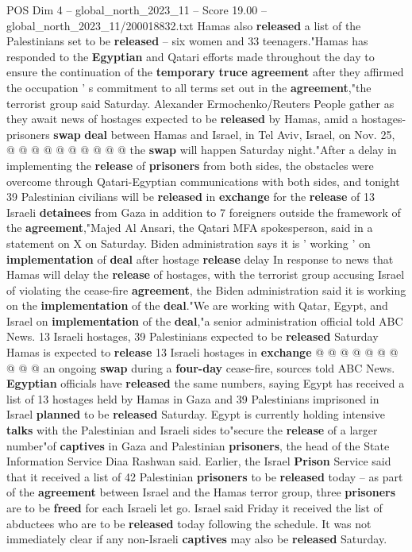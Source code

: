 \begin{textsample}{POS Dim 4 – global\_north\_2023\_11 – Score 19.00 – global\_north\_2023\_11/200018832.txt}
Hamas also \textbf{released} a list of the Palestinians set to be \textbf{released} -- six women and 33 teenagers."Hamas has responded to the \textbf{Egyptian} and Qatari efforts made throughout the day to ensure the continuation of the \textbf{temporary} \textbf{truce} \textbf{agreement} after they affirmed the occupation ' s commitment to all terms set out in the \textbf{agreement},"the terrorist group said Saturday.
Alexander Ermochenko/Reuters People gather as they await news of hostages expected to be \textbf{released} by Hamas, amid a hostages-prisoners \textbf{swap} \textbf{deal} between Hamas and Israel, in Tel Aviv, Israel, on Nov. 25, @ @ @ @ @ @ @ @ @ @ the \textbf{swap} will happen Saturday night."After a delay in implementing the \textbf{release} of \textbf{prisoners} from both sides, the obstacles were overcome through Qatari-Egyptian communications with both sides, and tonight 39 Palestinian civilians will be \textbf{released} in \textbf{exchange} for the \textbf{release} of 13 Israeli \textbf{detainees} from Gaza in addition to 7 foreigners outside the framework of the \textbf{agreement},"Majed Al Ansari, the Qatari MFA spokesperson, said in a statement on X on Saturday.
Biden administration says it is ' working ' on \textbf{implementation} of \textbf{deal} after hostage \textbf{release} delay In response to news that Hamas will delay the \textbf{release} of hostages, with the terrorist group accusing Israel of violating the cease-fire \textbf{agreement}, the Biden administration said it is working on the \textbf{implementation} of the \textbf{deal}."We are working with Qatar, Egypt, and Israel on \textbf{implementation} of the \textbf{deal},"a senior administration official told ABC News. 13 Israeli hostages, 39 Palestinians expected to be \textbf{released} Saturday Hamas is expected to \textbf{release} 13 Israeli hostages in \textbf{exchange} @ @ @ @ @ @ @ @ @ @ an ongoing \textbf{swap} during a \textbf{four-day} cease-fire, sources told ABC News. \textbf{Egyptian} officials have \textbf{released} the same numbers, saying Egypt has received a list of 13 hostages held by Hamas in Gaza and 39 Palestinians imprisoned in Israel \textbf{planned} to be \textbf{released} Saturday.
Egypt is currently holding intensive \textbf{talks} with the Palestinian and Israeli sides to"secure the \textbf{release} of a larger number"of \textbf{captives} in Gaza and Palestinian \textbf{prisoners}, the head of the State Information Service Diaa Rashwan said.
Earlier, the Israel \textbf{Prison} Service said that it received a list of 42 Palestinian \textbf{prisoners} to be \textbf{released} today -- as part of the \textbf{agreement} between Israel and the Hamas terror group, three \textbf{prisoners} are to be \textbf{freed} for each Israeli let go.
Israel said Friday it received the list of abductees who are to be \textbf{released} today following the schedule.
It was not immediately clear if any non-Israeli \textbf{captives} may also be \textbf{released} Saturday.

\end{textsample}
